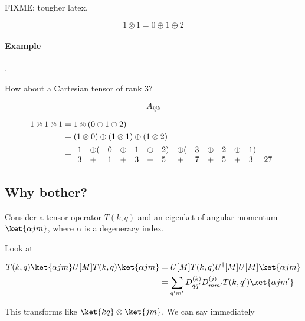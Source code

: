 FIXME: tougher latex.
%

\begin{equation}\label{eqn:qmTwoL20:90}
1 \otimes 1 = 0 \oplus 1 \oplus 2
\end{equation}

\paragraph{Example}.

How about a Cartesian tensor of rank 3?

\begin{equation}\label{eqn:qmTwoL20:110}
A_{ijk}
\end{equation}

\begin{align*}\label{eqn:qmTwoL20:130}
1 \otimes 1 \otimes 1  
&=
1 \otimes ( 0 \oplus 1 \oplus 2) \\
&=
(1 \otimes 0) \oplus (1 \otimes 1) \oplus (1 \otimes 2) \\
&=
\begin{array}{l l l l l l l l l l l l l l}
1 &\oplus ( &0 &\oplus &1 &\oplus &2) &\oplus (&3  &\oplus & 2 &\oplus &1) \\
3 &+        &1 &+      &3 &+      &5  &+       &7  &+      & 5 &+      &3 = 27
\end{array}
\end{align*}

\subsection{Why bother?}

Consider a tensor operator $T(k, q)$ and an eigenket of angular momentum $\ket{\alpha j m}$, where $\alpha$ is a degeneracy index.

Look at

\begin{align*}
T(k, q) \ket{\alpha j m}
U[M] T(k, q) \ket{\alpha j m}
&=
U[M] T(k, q) U^\dagger[M] U[M] \ket{\alpha j m} \\
&=
\sum_{q' m'} 
D^{(k)}_{q q'} 
D^{(j)}_{m m'} 
T(k, q') \ket{\alpha j m'} 
\end{align*}

This transforms like $\ket{k q} \otimes \ket{j m}$.  We can say immediately

